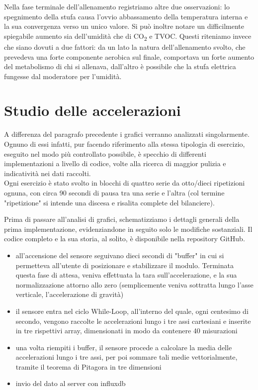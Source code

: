 \documentclass[fleqn,10pt]{SelfArx} %
\begin{document}
Nella fase terminale dell'allenamento registriamo altre due osservazioni: lo spegnimento della 
stufa causa l'ovvio abbassamento della temperatura interna e la sua convergenza verso un unico valore. 
Si può inoltre notare un difficilmente spiegabile aumento sia dell'umidità che di CO\textsubscript{2} e TVOC.
Questi riteniamo invece che siano dovuti a due fattori: da un lato la natura dell'allenamento svolto, 
che prevedeva una forte componente aerobica sul finale, comportava un forte aumento del metabolismo di chi 
si allenava, dall'altro è possibile che la stufa elettrica fungesse dal moderatore per l'umidità.\\

\section{Studio delle accelerazioni}

A differenza del paragrafo precedente i grafici verranno analizzati singolarmente. 
Ognuno di essi infatti, pur facendo riferimento alla stessa tipologia di esercizio, eseguito nel 
modo più controllato possibile, è specchio di differenti implementazioni a livello di codice, volte alla 
ricerca di maggior pulizia e indicatività nei dati raccolti.\\
Ogni esercizio è stato svolto in blocchi di quattro serie da otto/dieci ripetizioni ognuna, con circa 90 
secondi di pausa tra una serie e l'altra (col termine "ripetizione" si intende una discesa e risalita complete 
del bilanciere).

Prima di passare all'analisi di grafici, schematizziamo i dettagli generali della prima implementazione, 
evidenziandone in seguito solo le modifiche sostanziali. Il codice completo e la sua storia, al solito, 
è disponibile nella repository GitHub. 

\begin{itemize}[noitemsep] %
	\item all'accensione del sensore seguivano dieci secondi di "buffer" in cui si permetteva all'utente di 
	posizionare e stabilizzare il modulo. Terminata questa fase di attesa, veniva effettuata la tara 
	sull'accelerazione, e la sua normalizzazione attorno allo zero (semplicemente veniva sottratta lungo 
	l'asse verticale, l'accelerazione di gravità)
	\item il sensore entra nel ciclo While-Loop, all'interno del quale, ogni centesimo di secondo, vengono 
	raccolte le accelerazioni lungo i tre assi cartesiani e inserite in tre rispettivi array, dimensionati in 
	modo da contenere 40 misurazioni
	\item una volta riempiti i buffer, il sensore procede a calcolare la media delle accelerazioni lungo i 
	tre assi, per poi sommare tali medie vettorialmente, tramite il teorema di Pitagora in tre dimensioni
	\item invio del dato al server con influxdb
\end{itemize}
\end{document}
